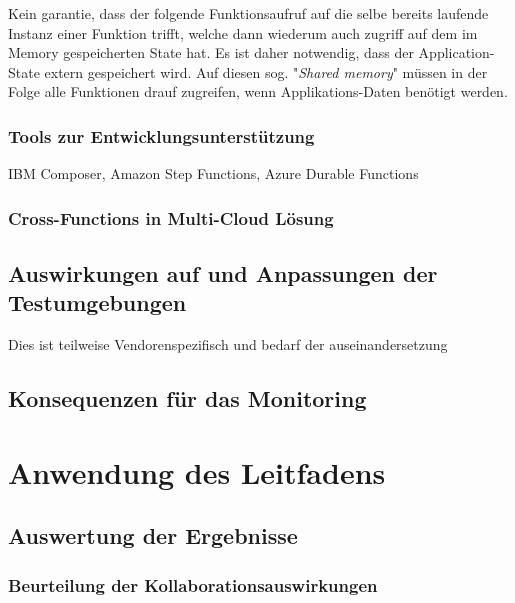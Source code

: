 \documentclass[11pt]{article}
\begin{document}
Kein garantie, dass der folgende Funktionsaufruf auf die selbe bereits laufende Instanz einer Funktion trifft, welche dann wiederum auch zugriff auf dem im Memory gespeicherten State hat. Es ist daher notwendig, dass der Application-State extern gespeichert wird. Auf diesen sog. "\textit{Shared memory}" müssen in der Folge alle Funktionen drauf zugreifen, wenn Applikations-Daten benötigt werden.
\subsubsection{Tools zur Entwicklungsunterstützung}
IBM Composer, Amazon Step Functions, Azure Durable Functions %
\subsubsection{Cross-Functions in Multi-Cloud Lösung}
\subsection{Auswirkungen auf und Anpassungen der Testumgebungen}
Dies ist teilweise Vendorenspezifisch und bedarf der auseinandersetzung 
\subsection{Konsequenzen für das Monitoring}
\section{Anwendung des Leitfadens}
\subsection{Auswertung der Ergebnisse}
\subsubsection{Beurteilung der Kollaborationsauswirkungen}
\end{document}
